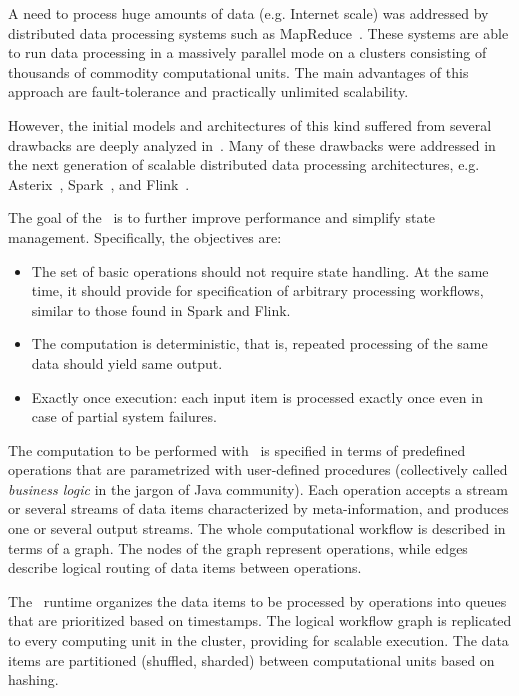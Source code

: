 
\label {fs-intro-seciton}

A need to process huge amounts of data (e.g. Internet scale) was addressed by distributed data processing systems such as MapReduce~\cite{Dean:2008:MSD:1327452.1327492}. These systems are able to run data processing in a massively parallel mode on a clusters consisting of thousands of commodity computational units. The main advantages of this approach are fault-tolerance and practically unlimited scalability.

However, the initial models and architectures of this kind suffered from several drawbacks are deeply analyzed in~\cite{Doulkeridis:2014:SLA:2628707.2628782}. 
Many of these drawbacks were addressed in the next generation of scalable distributed data processing architectures, e.g. 
Asterix~\cite{Alsubaiee:2012:ASW:2331801.2331803}, 
Spark~\cite{Zaharia:2016:ASU:3013530.2934664,Franklin:2015:MSB:2684822.2685326}, 
and Flink~\cite{Carbone:2017:SMA:3137765.3137777}. 

The goal of the \FlameStream ~is to further improve performance and simplify state management. Specifically, the objectives are:

\begin {itemize}
\item The set of basic operations should not require state handling. At the same time, it should provide for specification of arbitrary processing workflows, similar to those found in Spark and Flink. 
\item The computation is deterministic, that is, repeated processing of the same data should yield same output.
\item Exactly once execution: each input item is processed exactly once even in case of partial system failures. 
\end {itemize}

The computation to be performed with \FlameStream ~is specified in terms of predefined operations that are parametrized with user-defined procedures (collectively called {\em business logic} in the jargon of Java community). Each operation accepts a stream or several streams of data items characterized by meta-information, and produces one or several output streams. The whole computational workflow is described in terms of a graph. The nodes of the graph represent operations, while edges describe logical routing of data items between operations.

The \FlameStream ~runtime organizes the data items to be processed by operations into queues that are prioritized based on timestamps. The logical workflow graph is replicated to every computing unit in the cluster, providing for scalable execution. The data items are partitioned (shuffled, sharded) between computational units based on hashing.

